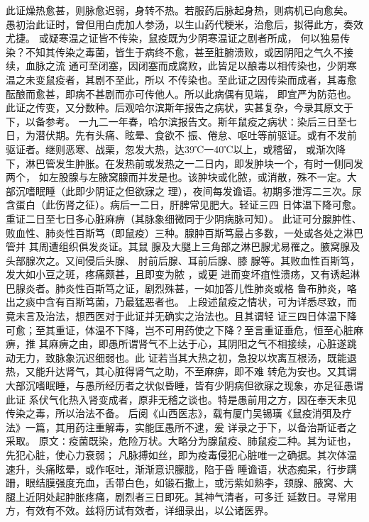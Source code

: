 \documentclass[a4paper,12pt,UTF8,twoside]{ctexbook}
\begin{document}
此证燥热愈甚，则脉愈迟弱，身转不热。若服药后脉起身热，则病机已向愈矣。 
愚初治此证时，曾但用白虎加人参汤，以生山药代粳米，治愈后，拟得此方，奏效尤捷。 
或疑寒温之证皆不传染，鼠疫既为少阴寒温证之剧者所成， 
何以独易传染？不知其传染之毒菌，皆生于病终不愈，甚至脏腑溃败，或因阴阳之气久不接续，血脉之流 
通可至闭塞，因闭塞而成腐败，此皆足以酿毒以相传染也，少阴寒温之未变鼠疫者，其剧不至此，所以 
不传染也。至此证之因传染而成者，其毒愈酝酿而愈甚，即病不甚剧而亦可传他人。所以此病偶有见端， 
即宜严为防范也。 
此证之传变，又分数种。后观哈尔滨斯年报告之病状，实甚复杂，今录其原文于下，以备参考。 
一九二一年春，哈尔滨报告文。斯年鼠疫之病状∶染后三日至七日，为潜伏期。先有头痛、眩晕、食欲不 
振、倦怠、呕吐等前驱证。或有不发前驱证者。继则恶寒、战栗，忽发大热，达39℃一40℃以上，或稽留， 
或渐次降下，淋巴管发生肿胀。在发热前或发热之一二日内，即发肿块一个，有时一侧同发两个， 
如左股腺与左腋窝腺而并发是也。该肿块或化脓，或消散，殊不一定。大部沉嗜眠睡（此即少阴证之但欲寐之 
理），夜间每发谵语。初期多泄泻二三次。尿含蛋白（此伤肾之征）。病后一二日，肝脾常见肥大。轻证三四 
日体温下降可愈。重证二日至七日多心脏麻痹（其脉象细微同于少阴病脉可知）。 
此证可分腺肿性、败血性、肺炎性百斯笃（即鼠疫）三种。腺肿百斯笃最占多数，一处或各处之淋巴管并 
其周遭组织俱发炎证。其鼠 腺及大腿上三角部之淋巴腺尤易罹之。腋窝腺及头部腺次之。又间侵后头腺、 
肘前后腺、耳前后腺、膝 腺等。其败血性百斯笃，发大如小豆之斑，疼痛颇甚，且即变为脓 ，或更 
进而变坏疽性溃疡，又有诱起淋巴腺炎者。肺炎性百斯笃之证，剧烈殊甚，一如加答儿性肺炎或格 
鲁布肺炎，咯出之痰中含有百斯笃菌，乃最猛恶者也。 
上段述鼠疫之情状，可为详悉尽致，而竟未言及治法，想西医对于此证并无确实之治法也。且其谓轻 
证三四日体温下降可愈；至其重证，体温不下降，岂不可用药使之下降？至言重证垂危，恒至心脏麻痹，推 
其麻痹之由，即愚所谓肾气不上达于心，其阴阳之气不相接续，心脏遂跳动无力，致脉象沉迟细弱也。此 
证若当其大热之初，急投以坎离互根汤，既能退热，又能升达肾气，其心脏得肾气之助，不至麻痹，即不难 
转危为安也。又其谓大部沉嗜眠睡，与愚所经历者之状似昏睡，皆有少阴病但欲寐之现象，亦足征愚谓此证 
系伏气化热入肾变成者，原非无稽之谈也。特是愚前用之方，因在奉天未见传染之毒，所以治法不备。 
后阅《山西医志》，载有厦门吴锡璜《鼠疫消弭及疗法》一篇，其用药注重解毒，实能匡愚所不逮，爰 
详录之于下，以备治斯证者之采取。 
原文∶疫菌既染，危险万状。大略分为腺鼠疫、肺鼠疫二种。其为证也，先犯心脏，使心力衰弱； 
凡脉搏如丝，即为疫毒侵犯心脏唯一之确据。其次体温速升，头痛眩晕，或作呕吐，渐渐意识朦胧，陷于昏 
睡谵语，状态痴呆，行步蹒跚，眼结膜强度充血，舌带白色，如锻石撒上，或污紫如熟李，颈腺、腋窝、大 
腿上近阴处起肿胀疼痛，剧烈者三日即死。其神气清者，可多迁 
延数日。寻常用方，有效有不效。兹将历试有效者，详细录出，以公诸医界。 
\end{document}
